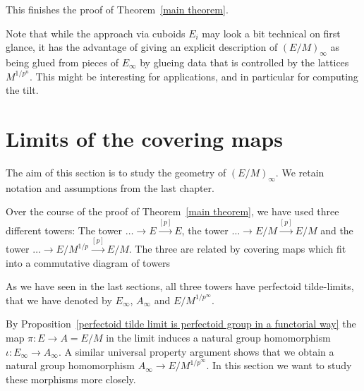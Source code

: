 \documentclass[10pt,oneside]{amsart}
\theoremstyle{definition}
\theoremstyle{remark}
\begin{document}
	This finishes the proof of Theorem~\ref{main theorem}.
	
	Note that while the approach via cuboids $E_i$ may look a bit technical on first glance, it has the advantage of giving an explicit description of $(E/M)_\infty$ as being glued from pieces of $E_\infty$ by glueing data that is controlled by the lattices $M^{1/p^n}$. This might be interesting for applications, and in particular for computing the tilt. 
	
	
	\section{Limits of the covering maps}
	The aim of this section is to study the geometry of $(E/M)_\infty$. We retain notation and assumptions from the last chapter.
	
	Over the course of the proof of Theorem~\ref{main theorem}, we have used three different towers: The tower $\dots \rightarrow E\xrightarrow{[p]} E$, the tower $\dots \rightarrow E/M \xrightarrow{[p]} E/M$ and the tower $\dots \rightarrow E/M^{1/p} \xrightarrow{[p]} E/M$. The three are related by covering maps which fit into a commutative diagram of towers
	\begin{center}
	\end{center}
	As we have seen in the last sections, all three towers have perfectoid tilde-limits, that we have denoted by $E_\infty$, $A_\infty$ and $E/M^{1/p^\infty}$.
	
	By Proposition~\ref{perfectoid tilde limit is perfectoid group in a functorial way} the map $\pi:E\rightarrow A=E/M$ in the limit induces a natural group homomorphism $\iota:E_\infty \rightarrow A_\infty$. A similar universal property argument shows that we obtain a natural group homomorphism $A_\infty \rightarrow E/M^{1/p^\infty}$. In this section we want to study these morphisms more closely.
	
\end{document}
